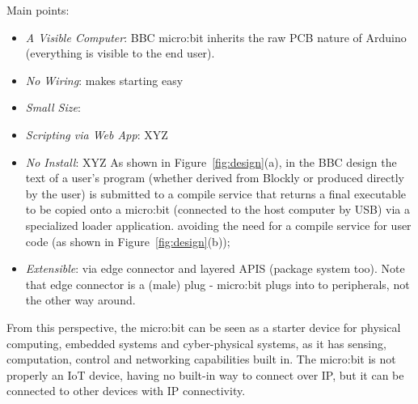 Main points:
\begin{itemize}
\item {\em A Visible Computer}: BBC micro:bit inherits the raw PCB nature of Arduino  (everything is visible to the end user).
\item {\em No Wiring}: makes starting easy
\item {\em Small Size}: 
\item {\em Scripting via Web App}: XYZ
\item {\em No Install}: XYZ
As shown in Figure~\ref{fig:design}(a), in the BBC design
the text of a user's program (whether derived from Blockly or produced directly by the user)
is submitted to a compile service that returns a final executable to be copied onto a micro:bit (connected to the host 
computer by USB) via a specialized loader application.  
avoiding the need for a compile service for user code (as shown 
in Figure~\ref{fig:design}(b));
\item {\em Extensible}: via edge connector and layered APIS (package system too). Note
that edge connector is a (male) plug - micro:bit plugs into to peripherals, not the
other way around.
\end{itemize}
From this perspective, the micro:bit can be seen as a starter device
for physical computing, embedded systems and cyber-physical systems, as it has
sensing, computation, control and networking capabilities built in.  The
micro:bit is not properly an IoT device, having no built-in way to connect
over IP, but it can be connected to other devices with IP connectivity. 


 



